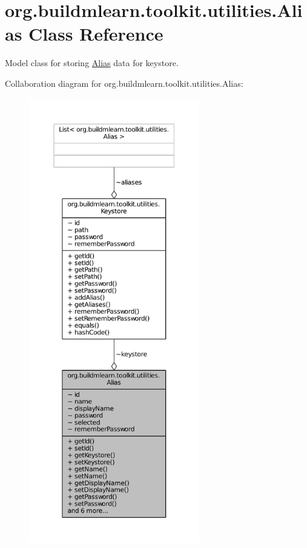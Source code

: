 \hypertarget{classorg_1_1buildmlearn_1_1toolkit_1_1utilities_1_1Alias}{\section{org.\-buildmlearn.\-toolkit.\-utilities.\-Alias Class Reference}
\label{classorg_1_1buildmlearn_1_1toolkit_1_1utilities_1_1Alias}
}


Model class for storing \hyperlink{classorg_1_1buildmlearn_1_1toolkit_1_1utilities_1_1Alias}{Alias} data for keystore.  




Collaboration diagram for org.\-buildmlearn.\-toolkit.\-utilities.\-Alias\-:
\nopagebreak
\begin{figure}[H]
\begin{center}
\leavevmode
\includegraphics[height=550pt]{d5/dab/classorg_1_1buildmlearn_1_1toolkit_1_1utilities_1_1Alias__coll__graph}
\end{center}
\end{figure}
